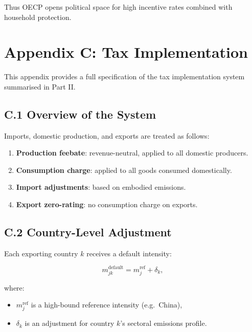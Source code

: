 \documentclass[12pt]{article}
\begin{document}
Thus OECP opens political space for high incentive rates combined with 
household protection.

\section{Appendix C: Tax Implementation}

This appendix provides a full specification of the tax implementation system 
summarised in Part II.

\subsection{C.1 Overview of the System}

Imports, domestic production, and exports are treated as follows:

\begin{enumerate}
    \item \textbf{Production feebate}: revenue-neutral, applied to all domestic producers.
    \item \textbf{Consumption charge}: applied to all goods consumed domestically.
    \item \textbf{Import adjustments}: based on embodied emissions.
    \item \textbf{Export zero-rating}: no consumption charge on exports.
\end{enumerate}

\subsection{C.2 Country-Level Adjustment}

Each exporting country $k$ receives a default intensity:

\[
m_{jk}^{\text{default}} = m_j^{\text{ref}} + \delta_k,
\]

where:

\begin{itemize}
    \item $m_j^{\text{ref}}$ is a high-bound reference intensity (e.g.\ China),
    \item $\delta_k$ is an adjustment for country $k$'s sectoral emissions profile.
\end{itemize}
\end{document}
